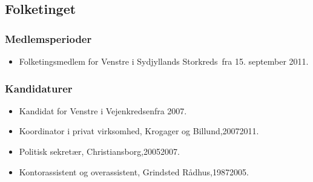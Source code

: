 \documentclass[11pt, a4paper]{awesome-cv}
\begin{document}
\begin{cvletter}
\subsection*{Folketinget}
\subsubsection*{Medlemsperioder}
\begin{itemize}
\item Folketingsmedlem for Venstre i Sydjyllands Storkreds fra 15. september 2011.
\end{itemize}
\subsubsection*{Kandidaturer}
\begin{itemize}
\item Kandidat for Venstre i Vejenkredsenfra 2007.
\end{itemize}
\begin{itemize}
\item Koordinator i privat virksomhed, Krogager og Billund,20072011.
\item Politisk sekretær, Christiansborg,20052007.
\item Kontorassistent og overassistent, Grindsted Rådhus,19872005.
\end{itemize}
\end{cvletter}
\end{document}
